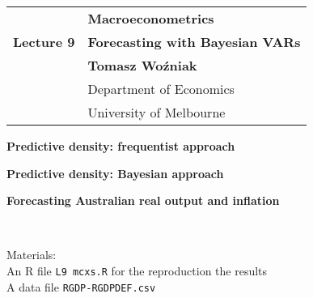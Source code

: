 \documentclass[notes,blackandwhite,mathsans,usenames,dvipsnames]{beamer}
\begin{document}






{
\begin{frame}

\vspace{1cm}
\begin{tabular}{rl}
&\textbf{\LARGE\color{mcxs2} Macroeconometrics}\\[8ex]
\textbf{\Large\color{purple}Lecture 9}&\textbf{\Large\color{mcxs2}Forecasting with Bayesian VARs}\\[19ex]
&\textbf{\color{purple}Tomasz Wo\'zniak}\\[1ex]
&{\small\color{mcxs3} Department of Economics}\\
&{\small\color{mcxs3}University of Melbourne}
\end{tabular}

\end{frame}
}



{
\begin{frame}

\vspace{1cm}\textbf{\color{mcxs3}Predictive density: frequentist approach}

\bigskip\textbf{\color{mcxs2}Predictive density: Bayesian approach}

\bigskip\textbf{\color{mcxs3}Forecasting Australian real output and inflation}

\small
{} \\ \small
{}

\bigskip\small{\color{mcxs2}Materials:}\\ \footnotesize
{\color{mcxs4}An R file} {\color{mcxs3}\texttt{L9 mcxs.R}} {\color{mcxs4}for the reproduction the results}\\
{\color{mcxs4}A data file} {\color{mcxs3}\texttt{RGDP-RGDPDEF.csv}}
\end{frame}
}
\end{document}
